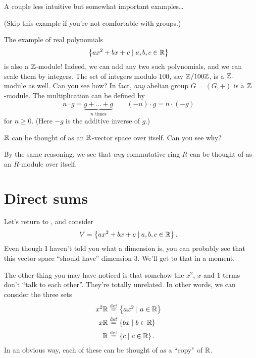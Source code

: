 A couple less intuitive but somewhat important examples\dots
\begin{example}
	(Skip this example if you're not comfortable with groups.)
	\begin{enumerate}[(a)]
		\ii The example of real polynomials
		\[ \left\{ ax^2+bx+c \mid a,b,c \in \mathbb R \right\} \]
		is also a $\mathbb Z$-module!
		Indeed, we can add any two such polynomials,
		and we can scale them by integers.
		\ii The set of integers modulo $100$, say $\mathbb Z/100\mathbb Z$,
		is a $\mathbb Z$-module as well. Can you see how?
		\ii In fact, \emph{any} abelian group $G = (G,+)$ is a $\mathbb Z$-module.
		The multiplication can be defined by
		\[ n \cdot g = \underbrace{g+\dots+g}_{\text{$n$ times}} 
		\qquad (-n) \cdot g = n \cdot (-g)\]
		for $n \ge 0$. (Here $-g$ is the additive inverse of $g$.)
	\end{enumerate}
\end{example}
\begin{example}
	\listhack
	\begin{enumerate}[(a)]
	\ii $\mathbb R$ can be thought of as an $\mathbb R$-vector space over itself.
	Can you see why?

	\ii By the same reasoning,
	we see that \emph{any} commutative ring $R$ can be thought of
	as an $R$-module over itself.
	\end{enumerate}
\end{example}

\section{Direct sums}
Let's return to , and consider
\[ V = \left\{ ax^2+bx+c \mid a,b,c \in \mathbb R \right\}.  \]
Even though I haven't told you what a dimension is,
you can probably see that this vector space ``should have'' dimension $3$.
We'll get to that in a moment.

The other thing you may have noticed is that somehow
the $x^2$, $x$ and $1$ terms don't ``talk to each other''.
They're totally unrelated.
In other words, we can consider the three sets
\begin{align*}
	x^2\mathbb R &\overset{\mathrm{def}}{=} \left\{ ax^2 \mid a \in \mathbb R \right\} \\
	x\mathbb R &\overset{\mathrm{def}}{=} \left\{ bx \mid b \in \mathbb R \right\} \\
	\mathbb R &\overset{\mathrm{def}}{=} \left\{ c \mid c \in \mathbb R \right\}.
\end{align*}
In an obvious way, each of these can be thought of as a ``copy'' of $\mathbb R$.

